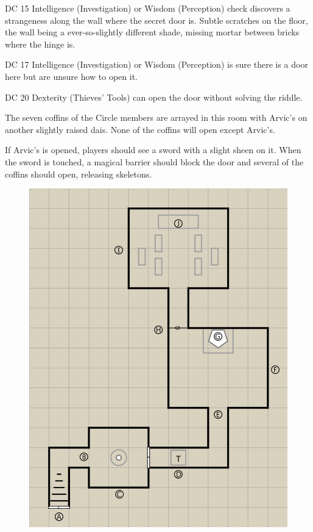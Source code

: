 \documentclass[10pt,twocolumn,openany,nodeprecatedcode,bg=none]{dndbook}
\begin{document}
DC 15 Intelligence (Investigation) or Wisdom (Perception) check discovers a strangeness along the wall where the secret door is.
Subtle scratches on the floor, the wall being a ever-so-slightly different shade, missing mortar between bricks where the hinge is.

DC 17 Intelligence (Investigation) or Wisdom (Perception) is sure there is a door here but are unsure how to open it.

DC 20 Dexterity (Thieves' Tools) can open the door without solving the riddle.

The seven coffins of the Circle members are arrayed in this room with Arvic's on another slightly raised dais.
None of the coffins will open except Arvic's.

If Arvic's is opened, players should see a sword with a slight sheen on it.
When the sword is touched, a magical barrier should block the door and several of the coffins should open, releasing skeletons.

\begin{figure}[h]
  \includegraphics[height=.75\textheight]{assets/tomb.png}
\end{figure}
\end{document}
